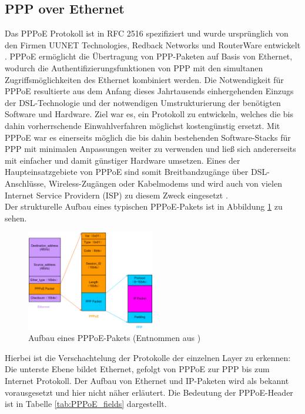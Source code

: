 \documentclass[journal,11pt]{IEEEtran}
\begin{document}
\subsection{PPP over Ethernet}
Das PPPoE Protokoll ist in RFC 2516 spezifiziert und wurde ursprünglich
von den Firmen UUNET Technologies, Redback Networks und RouterWare entwickelt \cite{RFC2516}.
PPPoE ermöglicht die Übertragung von PPP-Paketen auf Basis von Ethernet, wodurch
die Authentifizierungsfunktionen von PPP mit den
simultanen Zugriffsmöglichkeiten des Ethernet kombiniert werden.
Die Notwendigkeit für PPPoE resultierte aus dem Anfang dieses Jahrtausends
einhergehenden Einzugs der DSL-Technologie und der notwendigen Umstrukturierung
der benötigten Software und Hardware. Ziel war es, ein Protokoll zu entwickeln,
welches die bis dahin vorherrschende Einwahlverfahren möglichst kostengünstig
ersetzt. Mit PPPoE war es einerseits möglich die bis dahin bestehenden Software-Stacks für PPP
mit minimalen Anpassungen weiter zu verwenden und ließ sich andererseits mit einfacher
und damit günstiger Hardware umsetzen\cite{dslapp}.
Eines der Haupteinsatzgebiete von PPPoE sind somit Breitbandzugänge über DSL-Anschlüsse,
Wireless-Zugängen oder Kabelmodems und wird
auch von vielen Internet Service Providern (ISP) zu diesem Zweck eingesetzt \cite[p.88]{cisconut}.\\
%
Der strukturelle Aufbau eines typischen PPPoE-Pakets ist in Abbildung \ref{fig:PPPoE_Bild} zu sehen.
\begin{figure}[h!]
 \centering
  \includegraphics[width=0.5\textwidth]{img/pppoe_aufbau.jpg}
 \caption{Aufbau eines PPPoE-Pakets (Entnommen aus \cite{pppoe_h3c})}
 \label{fig:PPPoE_Bild}
\end{figure}
Hierbei ist die Verschachtelung der Protokolle der einzelnen Layer zu erkennen: Die unterste
Ebene bildet Ethernet, gefolgt von PPPoE zur PPP bis zum Internet Protokoll.
Der Aufbau von Ethernet und IP-Paketen wird als bekannt vorausgesetzt und hier nicht näher erläutert.
Die Bedeutung der PPPoE-Header ist in Tabelle \ref{tab:PPPoE_fields} dargestellt.
\end{document}
